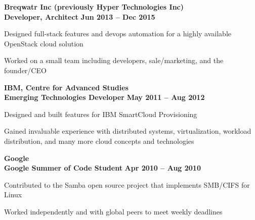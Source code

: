 \documentclass[margin,line]{resume}
\begin{document}
\begin{resume}
    \hspace{-3mm}\textbf{\listing Breqwatr Inc (previously Hyper Technologies Inc)} \vspace{2mm}\\\vspace{1mm}
    \hspace{1.2mm}\textbf{Developer, Architect} \hfill \textbf{Jun 2013 -- Dec 2015}\vspace{1mm}
    \begin{list2}
        \item Designed full-stack features and devops automation for a highly available OpenStack cloud solution
        \item Worked on a small team including developers, sale/marketing, and the founder/CEO
    \end{list2}

    \hspace{-3mm}\textbf{\listing IBM, Centre for Advanced Studies}\vspace{2mm}\\\vspace{1mm}
    \hspace{1.2mm}\textbf{Emerging Technologies Developer} \hfill \textbf{May 2011 -- Aug 2012}\vspace{1mm}
    \begin{list2}
        \item Designed and built features for IBM SmartCloud Provisioning
        \item Gained invaluable experience with distributed systems, virtualization, workload distribution, and many more cloud concepts and technologies
    \end{list2}

    \hspace{-3mm}\textbf{\listing Google}\vspace{2mm}\\\vspace{1mm}
    \hspace{1.2mm}\textbf{Google Summer of Code Student} \hfill \textbf{Apr 2010 -- Aug 2010}\vspace{1mm}
    \begin{list2}
        \item Contributed to the Samba open source project that implements SMB/CIFS for Linux
        \item Worked independently and with global peers to meet weekly deadlines
    \end{list2}



\end{resume}
\end{document}
